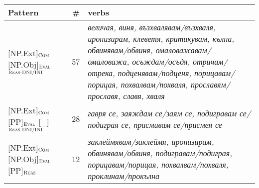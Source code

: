 \documentclass[output=paper,colorlinks,citecolor=brown]{langscibook}
\begin{document}
\begin{table}[t]
\small
\begin{tabularx}{\textwidth}{ lrQ }
\lsptoprule
Pattern  & \#  & verbs \\
\midrule
{[NP.Ext]}$_{\text{\textsc{Com}}}$ {[NP.Obj]}$_{\text{\textsc{Eval}}}$ \newline {[\_]}$_{\text{\textsc{Reas-DNI/INI}}}$  & 57 & \textit{величая, виня, възхвалявам\slash възхваля, иронизирам, клеветя, критикувам, кълна, обвинявам\slash обвиня, омаловажавам\slash омаловажа, осъждам\slash осъдя, отричам\slash отрека, подценявам\slash подценя, порицавам\slash порицая, похвалвам\slash похваля, прославям\slash прославя, славя, хваля}\\

{[NP.Ext]}$_{\text{\textsc{Com}}}$ {[PP]}$_{\text{\textsc{Eval}}}$  {[\_]}$_{\text{\textsc{Reas-DNI/INI}}}$& 28 & \textit{гавря се, заяждам се\slash заям се, подигравам се\slash подиграя се, присмивам се\slash присмея се}\\

{[NP.Ext]}$_{\text{\textsc{Com}}}$ {[NP.Obj]}$_{\text{\textsc{Eval}}}$   {[PP]}$_{\text{\textsc{Reas}}}$ & 12 & \textit{заклеймявам\slash заклеймя, иронизирам, обвинявам\slash обвиня, подигравам\slash подиграя, порицавам\slash порицая, похвалвам\slash похваля, проклинам\slash прокълна}\\





\end{tabularx}
\end{table}
\end{document}
